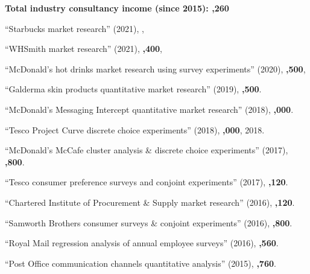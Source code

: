 \documentclass[12pt]{article}
\newcommand{\halfblankline}{\quad\vspace{-0.5\baselineskip}\pagebreak[3]}
\begin{document}
\begin{bibsection}
	\item \textbf{Total industry consultancy income (since 2015): 
	,260}

	\item ``Starbucks market research'' (2021),
	\textbf{},
	
	\item ``WHSmith market research'' (2021),
	\textbf{,400},

	\item ``McDonald's hot drinks market research using survey experiments'' (2020),
	\textbf{,500},
	
	\item ``Galderma skin products quantitative market research'' (2019),
	\textbf{,500}.

	\item ``McDonald's Messaging Intercept quantitative market research'' (2018), 
	\textbf{,000}.
	
	\item ``Tesco Project Curve discrete choice experiments'' (2018),  
	\textbf{,000}, 2018.

	\item ``McDonald's McCafe cluster analysis \& discrete choice experiments'' (2017), 
	\textbf{,800}.

	\item ``Tesco consumer preference surveys and conjoint experiments'' (2017),
	\textbf{,120}.

	\item ``Chartered Institute of Procurement \& Supply market research'' (2016),
	\textbf{,120}.

	\item ``Samworth Brothers consumer surveys \& conjoint experiments'' (2016),
	\textbf{,800}.

	\item ``Royal Mail regression analysis of annual employee surveys'' (2016),
	\textbf{,560}.
	
	\item ``Post Office communication channels quantitative analysis'' (2015),
	\textbf{,760}.
\end{bibsection}	

\halfblankline
	
\end{document}
